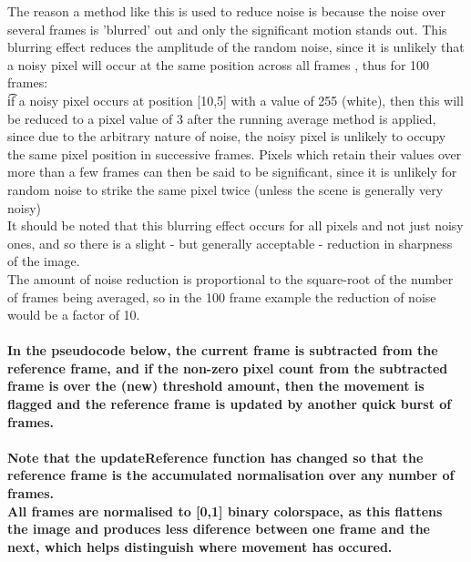 \documentclass[11pt]{article} %
\begin{document}
The reason a method like this is used to reduce noise is because the noise over several frames is 'blurred' out and only the significant motion stands out. This blurring effect reduces the amplitude of the random noise, since it is unlikely that a noisy pixel will occur at the same position across all frames , thus for 100 frames: \\\t if a noisy pixel occurs at position [10,5] with a value of 255 (white), then this will be reduced to a pixel value of 3 after the running average method is applied, since due to the arbitrary nature of noise, the noisy pixel is unlikely to occupy the same pixel position in successive frames. Pixels which retain their values over more than a few frames can then be said to be significant, since it is unlikely for random noise to strike the same pixel twice (unless the scene is generally very noisy)\\
It should be noted that this blurring effect occurs for all pixels and not just noisy ones, and so there is a slight - but generally acceptable - reduction in sharpness of the image.\\
The amount of noise reduction is proportional to the square-root of the number of frames being averaged, so in the 100 frame example the reduction of noise would be a factor of 10.

\paragraph{
In the pseudocode below, the current frame is subtracted from the reference frame, and if the non-zero pixel count from the subtracted frame is over the (new) threshold amount, then the movement is flagged and the reference frame is updated by another quick burst of frames.
}
\begin{frame}[fragile]
	
\end{frame}
\paragraph{Note that the updateReference function has changed so that the reference frame is the accumulated normalisation over any number of frames. \\
All frames are normalised to [0,1]  binary colorspace, as this flattens the image and produces less diference between one frame and the next, which helps distinguish where movement has occured.
}
\end{document}
